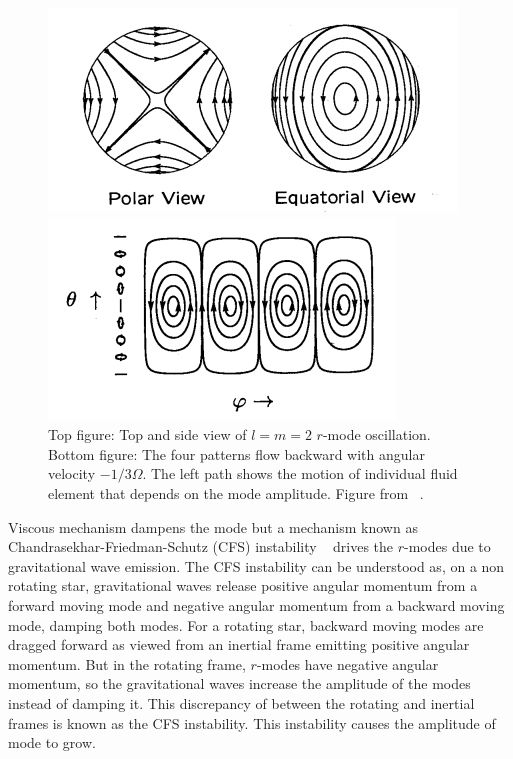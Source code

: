 \documentclass{ttuthes2007}
\begin{document}
\begin{figure}[h!]
  \centering
  \begin{minipage}[b]{0.5\textwidth}
    \includegraphics[width=\textwidth]{figure/rmodes.png}
  \end{minipage}
  \hfill
  \begin{minipage}[b]{0.5\textwidth}
    \includegraphics[width=\textwidth]{figure/rmodes1.png}
  \end{minipage}
\caption{Top figure: Top and side view of $l = m = 2$ $r$-mode oscillation.
Bottom figure: The four patterns flow backward with angular velocity $-1/3\Omega$. The
left path shows the motion of individual fluid element that depends on the mode
amplitude. Figure from ~\cite{lindblom2001neutron}.}
\end{figure}
 Viscous mechanism dampens the mode but a mechanism known as
Chandrasekhar-Friedman-Schutz (CFS) instability
~\cite{PhysRevLett.24.611}\cite{1978ApJ...222..281F} drives the $r$-modes due to
gravitational wave emission. The CFS instability can be understood as, on a non
rotating star, gravitational waves release positive angular momentum from
a forward moving mode and negative angular momentum from a backward moving mode,
damping both modes. For a rotating star, backward moving modes are dragged
forward as viewed from an inertial frame emitting positive angular momentum. But
in the rotating frame, $r$-modes have negative angular momentum, so the gravitational
waves increase the amplitude of the modes instead of damping it. This discrepancy
of between the rotating and inertial frames is known as the CFS
instability. This instability causes the amplitude of mode to
grow.~\cite{Owen_2000} 
\end{document}

